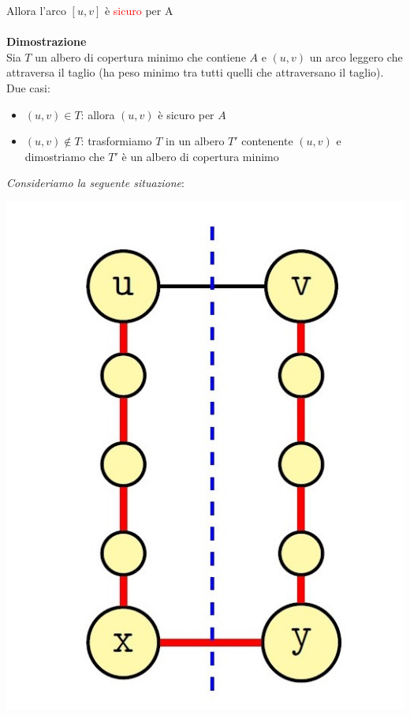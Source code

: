 \documentclass[../cheatSheetAlgoritmi.tex]{subfiles}
\begin{document}
Allora l'arco $[u, v]$ è \textcolor{red}{sicuro} per A\\\\
\textbf{Dimostrazione}\\
Sia $T$ un albero di copertura minimo che contiene $A$ e $(u, v)$ un arco leggero che attraversa il taglio (ha peso minimo tra tutti quelli che attraversano il taglio). Due casi:
\begin{itemize}
	\item $(u, v) \in T$: allora $(u, v)$ è sicuro per $A$
	\item $(u, v) \notin T$: trasformiamo $T$ in un albero $T'$ contenente $(u, v)$ e dimostriamo che $T'$ è un albero di copertura minimo
\end{itemize}
\newpage
\begin{flushleft}
\emph{Consideriamo la seguente situazione}:
\end{flushleft}
\noindent\begin{minipage}{0.3\textwidth}
\includegraphics[width=\linewidth]{../img/Greedy_5.jpg}
\end{minipage}
\end{document}
